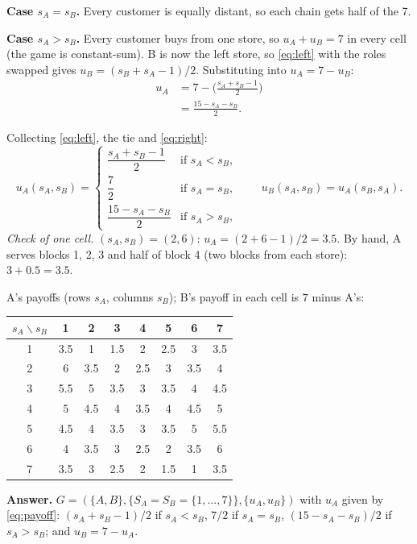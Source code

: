\documentclass[11pt,a4paper]{article}
\newcommand{\answer}[1]{\begin{tcolorbox}[colback=ans!5,colframe=ans,boxrule=0.6pt,
  left=5pt,right=5pt,top=3pt,bottom=3pt]\textbf{Answer.} #1\end{tcolorbox}}
\begin{document}
\textbf{Case $s_A = s_B$.} Every customer is equally distant, so each chain gets half of the 7.

\textbf{Case $s_A > s_B$.} Every customer buys from one store, so $u_A + u_B = 7$ in every cell
(the game is constant-sum). B is now the left store, so \eqref{eq:left} with the roles swapped
gives $u_B = (s_B + s_A - 1)/2$. Substituting into $u_A = 7 - u_B$:
\begin{align}
  u_A &= 7 - \Big(\frac{s_A + s_B - 1}{2}\Big) \nonumber\\
      &= \frac{15 - s_A - s_B}{2}. \label{eq:right}
\end{align}

Collecting \eqref{eq:left}, the tie and \eqref{eq:right}:
\begin{equation}
  u_A(s_A, s_B) =
  \begin{cases}
    \dfrac{s_A + s_B - 1}{2} & \text{if } s_A < s_B,\\[6pt]
    \dfrac{7}{2} & \text{if } s_A = s_B,\\[6pt]
    \dfrac{15 - s_A - s_B}{2} & \text{if } s_A > s_B,
  \end{cases}
  \qquad u_B(s_A, s_B) = u_A(s_B, s_A). \label{eq:payoff}
\end{equation}
\emph{Check of one cell.} $(s_A, s_B) = (2, 6)$: $u_A = (2 + 6 - 1)/2 = 3.5$. By hand, A
serves blocks 1, 2, 3 and half of block 4 (two blocks from each store): $3 + 0.5 = 3.5$.

A's payoffs (rows $s_A$, columns $s_B$); B's payoff in each cell is $7$ minus A's:
\begin{center}
\begin{tabular}{c|ccccccc}
$s_A \backslash s_B$ & 1 & 2 & 3 & 4 & 5 & 6 & 7 \\ \midrule
1 & 3.5 & 1   & 1.5 & 2   & 2.5 & 3   & 3.5 \\
2 & 6   & 3.5 & 2   & 2.5 & 3   & 3.5 & 4   \\
3 & 5.5 & 5   & 3.5 & 3   & 3.5 & 4   & 4.5 \\
4 & 5   & 4.5 & 4   & 3.5 & 4   & 4.5 & 5   \\
5 & 4.5 & 4   & 3.5 & 3   & 3.5 & 5   & 5.5 \\
6 & 4   & 3.5 & 3   & 2.5 & 2   & 3.5 & 6   \\
7 & 3.5 & 3   & 2.5 & 2   & 1.5 & 1   & 3.5
\end{tabular}
\end{center}

\answer{$G = (\{A,B\}, \{S_A = S_B = \{1,\dots,7\}\}, \{u_A, u_B\})$ with $u_A$ given by
\eqref{eq:payoff}: $(s_A + s_B - 1)/2$ if $s_A < s_B$, $7/2$ if $s_A = s_B$, $(15 - s_A - s_B)/2$ if
$s_A > s_B$; and $u_B = 7 - u_A$.}
\end{document}
